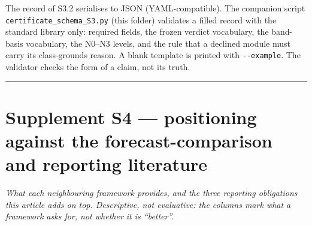\documentclass[11pt]{article}
\begin{document}
The record of S3.2 serialises to JSON (YAML-compatible). The companion
script \texttt{certificate\_schema\_S3.py} (this folder) validates a
filled record with the standard library only: required fields, the
frozen verdict vocabulary, the band-basis vocabulary, the N0--N3 levels,
and the rule that a declined module must carry its class-grounds reason.
A blank template is printed with \texttt{-\/-example}. The validator
checks the form of a claim, not its truth.

\begin{center}\rule{0.5\linewidth}{0.5pt}\end{center}

\section{Supplement S4 --- positioning against the forecast-comparison
and reporting
literature}\label{supplement-s4-positioning-against-the-forecast-comparison-and-reporting-literature}

\emph{What each neighbouring framework provides, and the three reporting
obligations this article adds on top. Descriptive, not evaluative: the
columns mark what a framework asks for, not whether it is ``better''.}
\end{document}
